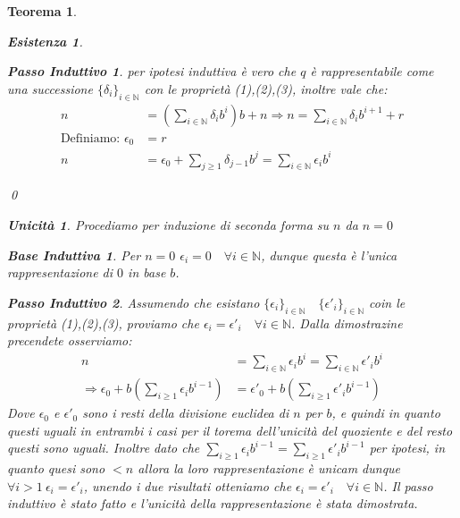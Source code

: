 \documentclass{article}
\makeatletter
\renewenvironment{proof}[1][\proofname]{\par
    \pushQED{\qed}%
    \normalfont \topsep6\p@\@plus6\p@\relax
    \trivlist
    \item\relax
    {\itshape
    #1\@addpunct{.}}\hspace\labelsep\ignorespaces
    }{%
    \popQED\endtrivlist\@endpefalse
}
\newtheorem{theorem}{Teorema}[part]
\newtheorem*{existence}{Esistenza}
\newtheorem*{uniqueness}{Unicità}
\newtheorem*{base}{Base Induttiva}
\newtheorem*{step}{Passo Induttivo}
\makeatother
\begin{document}
\begin{theorem}
\begin{proof}
\begin{existence}
\begin{step}
                per ipotesi induttiva è vero che \(q\) è rappresentabile come una successione \(\{\delta_i\}_{i\in\mathbb{N}}\) con le proprietà (1),(2),(3),
                inoltre vale che:
                \[
                    \begin{aligned}
                        n&=(\sum_{i\in\mathbb{N}}\delta_ib^i)b+n\Rightarrow n=\sum_{i\in\mathbb{N}}\delta_ib^{i+1}+r\\
                        \text{Definiamo: }\epsilon_0&=r\\
                        n&=\epsilon_0+\sum_{j\geq 1}\delta_{j-1}b^j=\sum_{i\in\mathbb{N}}\epsilon_ib^i
                    \end{aligned}
                \]
            \end{step}
        \qed
        \end{existence}
        \begin{uniqueness}
            Procediamo per induzione di seconda forma su \(n\) da \(n=0\)
            \begin{base}
                Per \(n=0\) \(\epsilon_i=0\quad \forall i\in\mathbb{N}\), dunque questa è l'unica rappresentazione di \(0\) in base \(b\).
            \end{base}
            \begin{step}
                Assumendo che esistano \(\{\epsilon_i\}_{i\in\mathbb{N}}\quad \{\epsilon'_i\}_{i\in\mathbb{N}}\) coin le proprietà (1),(2),(3), proviamo che \(\epsilon_i=\epsilon'_i\quad \forall i\in\mathbb{N}\). 
                Dalla dimostrazine precendete osserviamo:
                \[
                    \begin{aligned}
                        n&=\sum_{i\in\mathbb{N}}\epsilon_ib^i=\sum_{i\in\mathbb{N}}\epsilon'_ib^i\\
                        \Rightarrow \epsilon_0+b(\sum_{i\geq1}\epsilon_ib^{i-1})&=\epsilon'_0+b(\sum_{i\geq1}\epsilon'_ib^{i-1})
                    \end{aligned}
                \]
                Dove \(\epsilon_0\) e \(\epsilon'_0\) sono i resti della divisione euclidea di \(n\) per \(b\), e quindi in quanto questi uguali in entrambi i casi per il torema dell'unicità del quoziente e del resto questi sono uguali.
                Inoltre dato che \(\sum_{i\geq1}\epsilon_ib^{i-1}=\sum_{i\geq1}\epsilon'_ib^{i-1}\) per ipotesi, in quanto quesi sono \(<n\) allora la loro rappresentazione è unicam dunque \(\forall i>1\ \epsilon_i=\epsilon'_i\), unendo i due risultati otteniamo che \(\epsilon_i=\epsilon'_i\quad \forall i\in\mathbb{N}\).
                Il passo induttivo è stato fatto e l'unicità della rappresentazione è stata dimostrata.
            \end{step}
        \end{uniqueness}
        \raggedleft{\pushQED{\ensuremath{\blacksquare}}}
    \end{proof}
\end{theorem}
\end{document}

